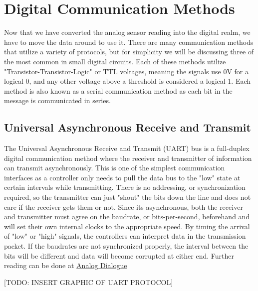 \chapter{Digital Communication Methods} \label{chap:digital_communications}
Now that we have converted the analog sensor reading into the digital realm, we have to move the data around to use it.
There are many communication methods that utilize a variety of protocols, but for simplicity we will be discussing three of the most common in small digital circuits.
Each of these methods utilize "Transistor-Transistor-Logic" or TTL voltages, meaning the signals use 0V for a logical 0, and any other voltage above a threshold is considered a logical 1.
Each method is also known as a serial communication method as each bit in the message is communicated in series.

\section[UART Explained]{Universal Asynchronous Receive and Transmit} \label{sec:uart}
The Universal Asynchronous Receive and Transmit (UART) bus is a full-duplex digital communication method where the receiver and transmitter of information can transmit asynchronously. 
This is one of the simplest communication interfaces as a controller only needs to pull the data bus to the "low" state at certain intervals while transmitting.
There is no addressing, or synchronization required, so the transmitter can just "shout" the bits down the line and does not care if the receiver gets them or not.
Since its asynchronous, both the receiver and transmitter must agree on the baudrate, or bits-per-second, beforehand and will set their own internal clocks to the appropriate speed.
By timing the arrival of "low" or "high" signals, the controllers can interpret data in the transmission packet.
If the baudrates are not synchronized properly, the interval between the bits will be different and data will become corrupted at either end.
Further reading can be done at \href{https://www.analog.com/en/analog-dialogue/articles/uart-a-hardware-communication-protocol.html}{Analog Dialogue}

[TODO: INSERT GRAPHIC OF UART PROTOCOL]

